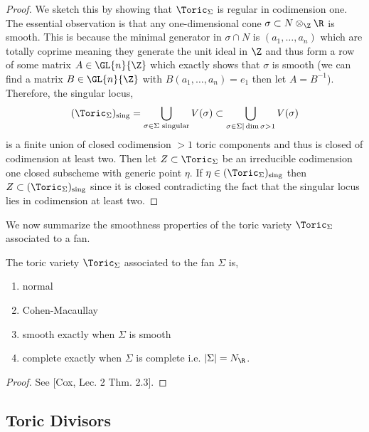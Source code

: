 \documentclass[12pt]{article}
\begin{document}
\begin{proof}
We sketch this by showing that $\Toric_\Sigma$ is regular in codimension one. The essential observation is that any one-dimensional cone $\sigma \subset N \otimes_\Z \R$ is smooth. This is because the minimal generator in $\sigma \cap N$ is $(a_1, \dots, a_n)$ which are totally coprime meaning they generate the unit ideal in $\Z$ and thus form a row of some matrix $A \in \GL{n}{\Z}$ which exactly shows that $\sigma$ is smooth (we can find a matrix $B \in \GL{n}{\Z}$ with $B (a_1, \dots, a_n) = e_1$ then let $A = B^{-1}$). Therefore, the singular locus,
\[ (\Toric_\Sigma)_{\text{sing}} = \bigcup_{\sigma \in \Sigma \text{ singular}} V(\sigma) \subset \bigcup_{\sigma \in \Sigma | \dim{\sigma} > 1} V(\sigma) \]
is a finite union of closed codimension $>1$ toric components and thus is closed of codimension at least two. Then let $Z \subset \Toric_\Sigma$ be an irreducible codimension one closed subscheme with generic point $\eta$. If $\eta \in (\Toric_\Sigma)_{\text{sing}}$ then $Z \subset (\Toric_\Sigma)_{\text{sing}}$ since it is closed contradicting the fact that the singular locus lies in codimension at least two.
\end{proof}
\noindent
We now summarize the smoothness properties of the toric variety $\Toric_\Sigma$ associated to a fan.

\begin{theorem}
The toric variety $\Toric_\Sigma$ associated to the fan $\Sigma$   is,
\begin{enumerate}
\item normal
\item Cohen-Macaullay
\item smooth exactly when $\Sigma$ is smooth
\item complete exactly when $\Sigma$ is complete i.e. $|\Sigma| = N_\R$. 
\end{enumerate}
\end{theorem}

\begin{proof}
See [Cox, Lec. 2 Thm. 2.3].
\end{proof}

\subsection{Toric Divisors}
\end{document}
